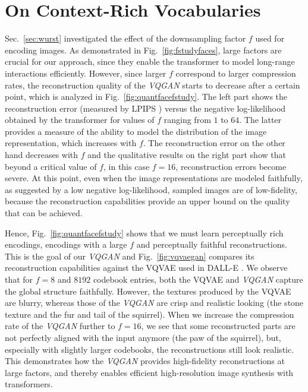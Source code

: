 \documentclass[final]{cvpr}
\begin{document}
\section{On Context-Rich Vocabularies}
\label{supp:contextrich}

\noindent
Sec.~\ref{sec:wurst} investigated the effect of the downsampling factor $f$ used
for encoding images. As demonstrated in Fig.~\ref{fig:fstudyfaces}, large
factors are crucial for our approach, since they enable the transformer to
model long-range interactions efficiently. However, since larger $f$ correspond
to larger compression rates, the reconstruction quality of the \emph{VQGAN} starts
to decrease after a certain point, which is analyzed in
Fig.~\ref{fig:quantfacefstudy}. The left part shows the reconstruction error
(measured by LPIPS \cite{zhang2018perceptual})
versus the negative log-likelihood obtained by the transformer for values of
$f$ ranging from $1$ to $64$. The latter provides a measure of the ability to
model the distribution of the image representation, which increases with $f$.
The reconstruction error on the other hand decreases with $f$ and the
qualitative results on the right part show that beyond a critical value of $f$,
in this case $f=16$, reconstruction errors become severe. At this point,
even when the image representations are modeled faithfully, as suggested by a
low negative log-likelihood, sampled images are of low-fidelity, because the
reconstruction capabilities provide an upper bound on the quality that can be
achieved.

Hence, Fig.~\ref{fig:quantfacefstudy} shows that we must learn perceptually
rich encodings, \ie encodings with a large $f$ and perceptually faithful
reconstructions. This is the goal of our \emph{VQGAN} and
Fig.~\ref{fig:vqvaegan} compares its reconstruction capabilities against the
VQVAE \cite{oord2018neural} used in DALL-E \cite{ramesh2021zeroshot}.  We
observe that for $f=8$ and $8192$ codebook entries, both the VQVAE and
\emph{VQGAN} capture the global structure faithfully. However, the textures
produced by the VQVAE are blurry, whereas those of the \emph{VQGAN} are crisp
and realistic looking (\eg the stone texture and the fur and tail of the
squirrel). When we increase the compression rate of the \emph{VQGAN} further to
$f=16$, we see that some reconstructed parts are not perfectly aligned with the
input anymore (\eg the paw of the squirrel), but, especially with slightly
larger codebooks, the reconstructions still look realistic. This demonstrates
how the \emph{VQGAN} provides high-fidelity reconstructions at large factors,
and thereby enables efficient high-resolution image synthesis with
transformers.
\end{document}
